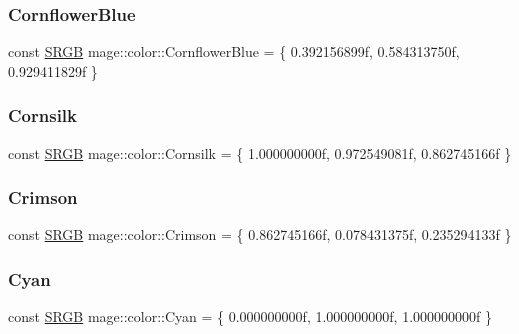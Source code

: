 \subsubsection{\texorpdfstring{Cornflower\+Blue}{CornflowerBlue}}
{\footnotesize\ttfamily const \hyperlink{structmage_1_1_s_r_g_b}{S\+R\+GB} mage\+::color\+::\+Cornflower\+Blue = \{ 0.\+392156899f, 0.\+584313750f, 0.\+929411829f \}}

\hypertarget{namespacemage_1_1color_ab82aaa06f9beb00be579b4ec9ea61e93}{}\label{namespacemage_1_1color_ab82aaa06f9beb00be579b4ec9ea61e93} 
\subsubsection{\texorpdfstring{Cornsilk}{Cornsilk}}
{\footnotesize\ttfamily const \hyperlink{structmage_1_1_s_r_g_b}{S\+R\+GB} mage\+::color\+::\+Cornsilk = \{ 1.\+000000000f, 0.\+972549081f, 0.\+862745166f \}}

\hypertarget{namespacemage_1_1color_afd7655203eafa71d325a42c50c9e957a}{}\label{namespacemage_1_1color_afd7655203eafa71d325a42c50c9e957a} 
\subsubsection{\texorpdfstring{Crimson}{Crimson}}
{\footnotesize\ttfamily const \hyperlink{structmage_1_1_s_r_g_b}{S\+R\+GB} mage\+::color\+::\+Crimson = \{ 0.\+862745166f, 0.\+078431375f, 0.\+235294133f \}}

\hypertarget{namespacemage_1_1color_ae00e5442ad8cee99d495cc16f719086d}{}\label{namespacemage_1_1color_ae00e5442ad8cee99d495cc16f719086d} 
\subsubsection{\texorpdfstring{Cyan}{Cyan}}
{\footnotesize\ttfamily const \hyperlink{structmage_1_1_s_r_g_b}{S\+R\+GB} mage\+::color\+::\+Cyan = \{ 0.\+000000000f, 1.\+000000000f, 1.\+000000000f \}}

\hypertarget{namespacemage_1_1color_a6dea3a266564281f1adf71a04753d6b4}{}\label{namespacemage_1_1color_a6dea3a266564281f1adf71a04753d6b4} 
